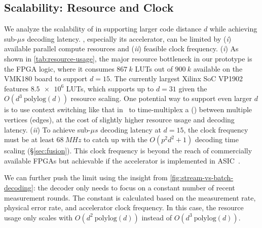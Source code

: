 \subsection{Scalability: Resource and Clock}\label{ssec:eva-resource}

We analyze the scalability of \system in supporting larger code distance $d$ while achieving sub-$\mu s$ decoding latency.
\system, especially its accelerator, can be limited by  (\textit{i}) available parallel compute resources  and (\textit{ii}) feasible clock frequency.
(\textit{i}) As shown in \autoref{tab:resource-usage}, the major resource bottleneck in our prototype is the FPGA logic, where it consumes $\qty{867}{k}$ LUTs out of $\qty{900}{k}$ available on the VMK180 board to support $d=15$.
The currently largest Xilinx SoC VP1902 features $\num{8.5e6}$ LUTs, which supports up to $d = 31$ given the $O(d^3\ \text{polylog}(d))$ resource scaling.
One potential way to support even larger $d$ is to use context switching like that in~\cite{liyanage2024fpga} to time-multiplex a \puv (\pue) between multiple vertices (edges), at the cost of slightly higher resource usage and decoding latency.
(\textit{ii}) To achieve sub-$\mu s$ decoding latency at $d=15$, the clock frequency must be at least $\qty{68}{MHz}$ to catch up with the $O(p^2 d^2 + 1)$ decoding time scaling (\S\ref{sec:fusion}).
This clock frequency is beyond the reach of commercially available FPGAs but achievable if the accelerator is implemented in ASIC~\cite{barber2023realtime,patra2017cryo,ueno2022neo,ueno2022qulatis}.

We can further push the limit using the insight from \autoref{fig:stream-vs-batch-decoding}: the decoder only needs to focus on a constant number of recent measurement rounds.
The constant is calculated based on the measurement rate, physical error rate, and accelerator clock frequency.
In this case, the resource usage only scales with $O(d^2\ \text{polylog}(d))$ instead of $O(d^3\ \text{polylog}(d))$.


